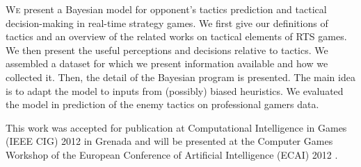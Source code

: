




\lettrine{W}{e} present a Bayesian model for opponent's tactics prediction and tactical decision-making in real-time strategy games. 
We first give our definitions of tactics and an overview of the related works on tactical elements of RTS games. 
We then present the useful perceptions and decisions relative to tactics. We assembled a dataset for which we present information available and how we collected it. Then, the detail of the Bayesian program is presented. The main idea is to adapt the model to inputs from (possibly) biased heuristics. We evaluated the model in prediction of the enemy tactics on professional gamers data. 

This work was accepted for publication at Computational Intelligence in Games (IEEE CIG) 2012 in Grenada \citep{SYNNAEVE:Tactics} and will be presented at the Computer Games Workshop of the European Conference of Artificial Intelligence (ECAI) 2012 \citep{SYNNAEVE:TacticsECAI}.


